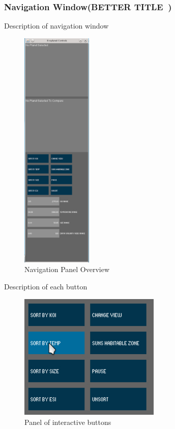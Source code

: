 \subsubsection{Navigation Window(BETTER TITLE~)}
Description of navigation window
\begin{figure}[h!]
  \centering
      \includegraphics[width=0.3\textwidth]{images/nav.png}
  \caption{Navigation Panel Overview}
  \label{fig:nav}
\end{figure}
Description of each button
\begin{figure}[h!]
  \centering
      \includegraphics[width=0.6\textwidth]{images/buttons.jpg}
  \caption{Panel of interactive buttons}
  \label{fig:buttons}
\end{figure}

